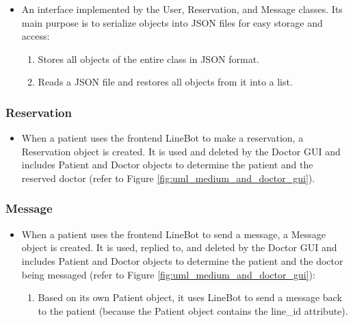 \documentclass{article}
\begin{document}
\begin{itemize}
    \item An interface implemented by the User, Reservation, and Message classes. Its main purpose is to serialize objects into JSON files for easy storage and access:
    \begin{enumerate}[label=(\roman*)]
        \item {} Stores all objects of the entire class in JSON format.
        \item {} Reads a JSON file and restores all objects from it into a list.
    \end{enumerate}
\end{itemize}

\subsubsection*{Reservation}

\begin{itemize}
    \item When a patient uses the frontend LineBot to make a reservation, a Reservation object is created. It is used and deleted by the Doctor GUI and includes Patient and Doctor objects to determine the patient and the reserved doctor (refer to Figure \ref{fig:uml_medium_and_doctor_gui}).
\end{itemize}

\subsubsection*{Message}

\begin{itemize}
    \item When a patient uses the frontend LineBot to send a message, a Message object is created. It is used, replied to, and deleted by the Doctor GUI and includes Patient and Doctor objects to determine the patient and the doctor being messaged (refer to Figure \ref{fig:uml_medium_and_doctor_gui}):
    \begin{enumerate}[label=(\roman*)]
        \item {} Based on its own Patient object, it uses LineBot to send a message back to the patient (because the Patient object contains the line\_id attribute).
    \end{enumerate}
\end{itemize}
\end{document}
